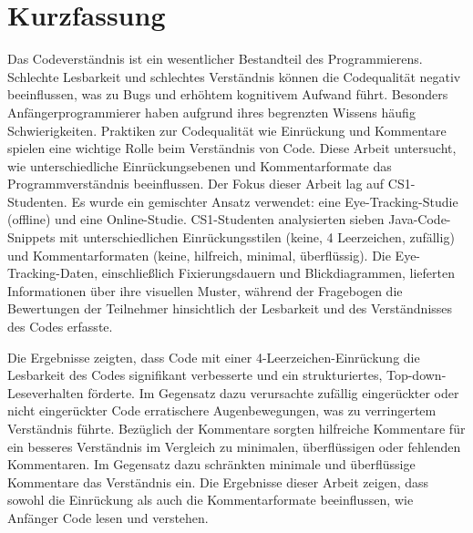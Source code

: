 \documentclass[14pt, a4paper, twoside, bibliography=totoc, headsepline, cleardoublepage=empty, parskip=half, draft=false]{scrbook}
\begin{document}




\Coverpage

\Copyright

\pagestyle{preamble}
\renewcommand*{\chapterpagestyle}{preamble}

\pagestyle{empty}

\section*{Kurzfassung}
Das Codeverständnis ist ein wesentlicher Bestandteil des Programmierens. Schlechte Lesbarkeit und schlechtes Verständnis können die Codequalität negativ beeinflussen, was zu Bugs und erhöhtem kognitivem Aufwand führt. Besonders Anfängerprogrammierer haben aufgrund ihres begrenzten Wissens häufig Schwierigkeiten. Praktiken zur Codequalität wie Einrückung und Kommentare spielen eine wichtige Rolle beim Verständnis von Code. Diese Arbeit untersucht, wie unterschiedliche Einrückungsebenen und Kommentarformate das Programmverständnis beeinflussen. Der Fokus dieser Arbeit lag auf CS1-Studenten. Es wurde ein gemischter Ansatz verwendet: eine Eye-Tracking-Studie (offline) und eine Online-Studie. CS1-Studenten analysierten sieben Java-Code-Snippets mit unterschiedlichen Einrückungsstilen (keine, 4 Leerzeichen, zufällig) und Kommentarformaten (keine, hilfreich, minimal, überflüssig). Die Eye-Tracking-Daten, einschließlich Fixierungsdauern und Blickdiagrammen, lieferten Informationen über ihre visuellen Muster, während der Fragebogen die Bewertungen der Teilnehmer hinsichtlich der Lesbarkeit und des Verständnisses des Codes erfasste. 

Die Ergebnisse zeigten, dass Code mit einer 4-Leerzeichen-Einrückung die Lesbarkeit des Codes signifikant verbesserte und ein strukturiertes, Top-down-Leseverhalten förderte. Im Gegensatz dazu verursachte zufällig eingerückter oder nicht eingerückter Code erratischere Augenbewegungen, was zu verringertem Verständnis führte. Bezüglich der Kommentare sorgten hilfreiche Kommentare für ein besseres Verständnis im Vergleich zu minimalen, überflüssigen oder fehlenden Kommentaren. Im Gegensatz dazu schränkten minimale und überflüssige Kommentare das Verständnis ein. Die Ergebnisse dieser Arbeit zeigen, dass sowohl die Einrückung als auch die Kommentarformate beeinflussen, wie Anfänger Code lesen und verstehen.
\end{document}
